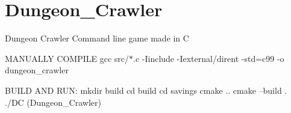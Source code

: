 \chapter{Dungeon\+\_\+\+Crawler }
\hypertarget{md__r_e_a_d_m_e}{}\label{md__r_e_a_d_m_e}
\label{md__r_e_a_d_m_e_autotoc_md0}%
%


Dungeon Crawler Command line game made in C

MANUALLY COMPILE gcc src/\+\texorpdfstring{$\ast$}{*}.c -\/Iinclude -\/Iexternal/\+dirent -\/std=c99 -\/o dungeon\+\_\+crawler

BUILD AND RUN:\+ mkdir build cd build cd savings cmake .. cmake --build . ./\+\+DC (Dungeon\+\_\+\+Crawler) 